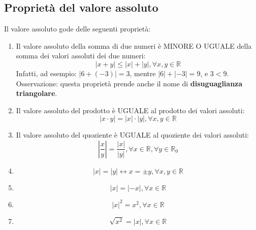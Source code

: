 \subsection{Proprietà del valore assoluto}
Il valore assoluto gode delle seguenti proprietà:
\begin{enumerate}
        \item Il valore assoluto della somma di due numeri è MINORE O UGUALE 
della somma dei valori assoluti dei due numeri:
        $$|x+y|\leq |x|+|y|, \forall x,y \in \mathbb{R}$$
        Infatti, ad esempio: $|6+(-3)|=3$, mentre $|6|+|-3|=9$, e $3<9$.\\
        Osservazione: questa proprietà prende anche il nome di 
\textbf{disuguaglianza triangolare}.
        \item Il valore assoluto del  prodotto è UGUALE al prodotto dei valori 
assoluti:
        $$|x\cdot y|=|x|\cdot |y|, \forall x,y \in \mathbb{R}$$
        \item Il valore assoluto del quoziente è UGUALE al quoziente dei valori 
assoluti:
        $$\left|\frac{x}{y} \right| =\frac{|x|}{|y|}, \forall x \in \mathbb{R}, 
\forall y \in \mathbb{R}_0$$
        \item $$|x|=|y| \leftrightarrow x=\pm y, \forall x,y \in \mathbb{R}$$
        \item $$|x|=|-x|, \forall x \in \mathbb{R}$$
        \item $$|x|^2=x^2, \forall x \in \mathbb{R}$$
        \item $$\sqrt{x^2}=|x|, \forall x \in \mathbb{R}$$
\end{enumerate}


